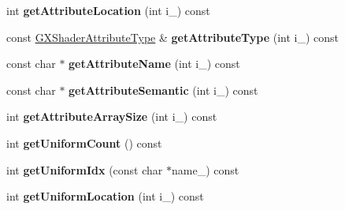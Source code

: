 \begin{DoxyCompactItemize}
\item 
int {\bfseries get\+Attribute\+Location} (int i\+\_\+) const \hypertarget{class_i_dream_sky_1_1_g_x_shader_program_ae9f2d5d93fb75a00ca8849d5c3217176}{}\label{class_i_dream_sky_1_1_g_x_shader_program_ae9f2d5d93fb75a00ca8849d5c3217176}

\item 
const \hyperlink{class_i_dream_sky_1_1_g_x_shader_attribute_type}{G\+X\+Shader\+Attribute\+Type} \& {\bfseries get\+Attribute\+Type} (int i\+\_\+) const \hypertarget{class_i_dream_sky_1_1_g_x_shader_program_af8f26063bfd202b43acab94952febeeb}{}\label{class_i_dream_sky_1_1_g_x_shader_program_af8f26063bfd202b43acab94952febeeb}

\item 
const char $\ast$ {\bfseries get\+Attribute\+Name} (int i\+\_\+) const \hypertarget{class_i_dream_sky_1_1_g_x_shader_program_ac7736f1b763e137093a34e927ab459e4}{}\label{class_i_dream_sky_1_1_g_x_shader_program_ac7736f1b763e137093a34e927ab459e4}

\item 
const char $\ast$ {\bfseries get\+Attribute\+Semantic} (int i\+\_\+) const \hypertarget{class_i_dream_sky_1_1_g_x_shader_program_a69f1d823710011652793671fc834ac6a}{}\label{class_i_dream_sky_1_1_g_x_shader_program_a69f1d823710011652793671fc834ac6a}

\item 
int {\bfseries get\+Attribute\+Array\+Size} (int i\+\_\+) const \hypertarget{class_i_dream_sky_1_1_g_x_shader_program_afb1d474ba89c64773dc9f2428ae5901c}{}\label{class_i_dream_sky_1_1_g_x_shader_program_afb1d474ba89c64773dc9f2428ae5901c}

\item 
int {\bfseries get\+Uniform\+Count} () const \hypertarget{class_i_dream_sky_1_1_g_x_shader_program_a7c4c8cfc18671c0d1a37a7b77909aa01}{}\label{class_i_dream_sky_1_1_g_x_shader_program_a7c4c8cfc18671c0d1a37a7b77909aa01}

\item 
int {\bfseries get\+Uniform\+Idx} (const char $\ast$name\+\_\+) const \hypertarget{class_i_dream_sky_1_1_g_x_shader_program_a43a4db63f482c23fea3325b561ab871b}{}\label{class_i_dream_sky_1_1_g_x_shader_program_a43a4db63f482c23fea3325b561ab871b}

\item 
int {\bfseries get\+Uniform\+Location} (int i\+\_\+) const \hypertarget{class_i_dream_sky_1_1_g_x_shader_program_a1ff7ad0c9212570616455d7f5a5ca280}{}\label{class_i_dream_sky_1_1_g_x_shader_program_a1ff7ad0c9212570616455d7f5a5ca280}


\end{DoxyCompactItemize}
